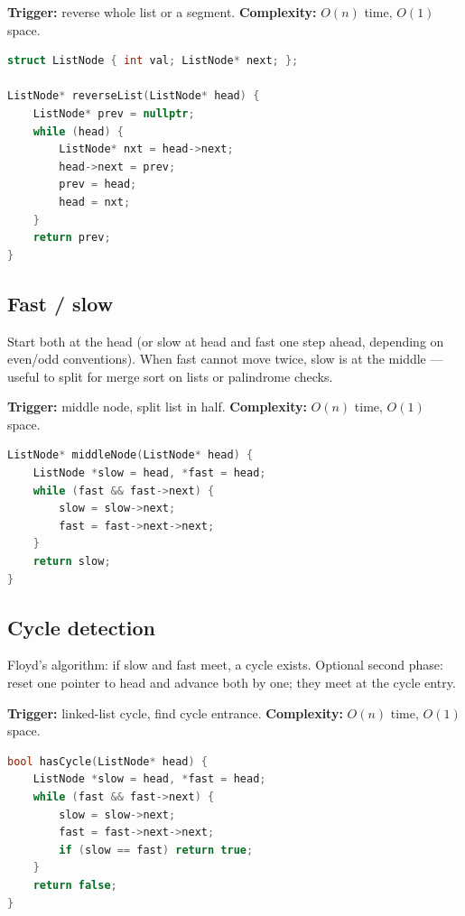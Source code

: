\textbf{Trigger:} reverse whole list or a segment.
\newline
\textbf{Complexity:} $O(n)$ time, $O(1)$ space.

\begin{lstlisting}[language=C++]
struct ListNode { int val; ListNode* next; };

ListNode* reverseList(ListNode* head) {
    ListNode* prev = nullptr;
    while (head) {
        ListNode* nxt = head->next;
        head->next = prev;
        prev = head;
        head = nxt;
    }
    return prev;
}
\end{lstlisting}

\subsection{Fast / slow}
\label{subsec:pat-ll-fast-slow}
Start both at the head (or slow at head and fast one step ahead, depending on
even/odd conventions). When fast cannot move twice, slow is at the middle ---
useful to split for merge sort on lists or palindrome checks.

\textbf{Trigger:} middle node, split list in half.
\newline
\textbf{Complexity:} $O(n)$ time, $O(1)$ space.

\begin{lstlisting}[language=C++]
ListNode* middleNode(ListNode* head) {
    ListNode *slow = head, *fast = head;
    while (fast && fast->next) {
        slow = slow->next;
        fast = fast->next->next;
    }
    return slow;
}
\end{lstlisting}

\subsection{Cycle detection}
\label{subsec:pat-ll-cycle}
Floyd's algorithm: if slow and fast meet, a cycle exists. Optional second phase:
reset one pointer to head and advance both by one; they meet at the cycle entry.

\textbf{Trigger:} linked-list cycle, find cycle entrance.
\newline
\textbf{Complexity:} $O(n)$ time, $O(1)$ space.

\begin{lstlisting}[language=C++]
bool hasCycle(ListNode* head) {
    ListNode *slow = head, *fast = head;
    while (fast && fast->next) {
        slow = slow->next;
        fast = fast->next->next;
        if (slow == fast) return true;
    }
    return false;
}
\end{lstlisting}

